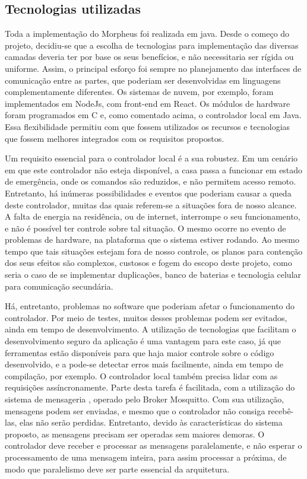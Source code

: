 \subsection{Tecnologias utilizadas}
Toda a implementação do Morpheus foi realizada em java. Desde o começo do projeto, decidiu-se que a escolha de tecnologias para implementação das diversas camadas deveria ter por base os seus benefícios, e não necessitaria ser rígida ou uniforme. Assim, o principal esforço foi sempre no planejamento das interfaces de comunicação entre as partes, que poderiam ser desenvolvidas em linguagens complementamente diferentes. Os sistemas de nuvem, por exemplo, foram implementados em NodeJs, com front-end em React. Os módulos de hardware foram programados em C e, como comentado acima, o controlador local em Java.
Essa flexibilidade permitiu com que fossem utilizados os recursos e tecnologias que fossem melhores integrados com os requisitos propostos. 

Um requisito essencial para o controlador local é a sua robustez. Em um cenário em que este controlador não esteja disponível, a casa passa a funcionar em estado de emergência, onde os comandos são reduzidos, e não permitem acesso remoto. Entretanto, há inúmeras possibilidades e eventos que poderiam causar a queda deste controlador, muitas das quais referem-se a situações fora de nosso alcance. A falta de energia na residência, ou de internet, interrompe o seu funcionamento, e não é possível ter controle sobre tal situação. O mesmo ocorre no evento de problemas de hardware, na plataforma que o sistema estiver rodando. Ao mesmo tempo que tais situações estejam fora de nosso controle, os planos para contenção dos seus efeitos são complexos, custosos e fogem do escopo deste projeto, como seria o caso de se implementar duplicações, banco de baterias e tecnologia celular para comunicação secundária.

Há, entretanto, problemas no software que poderiam afetar o funcionamento do controlador. Por meio de testes, muitos desses problemas podem ser evitados, ainda em tempo de desenvolvimento. A utilização de tecnologias que facilitam o desenvolvimento seguro da aplicação é uma vantagem para este caso, já que ferramentas estão disponíveis para que haja maior controle sobre o código desenvolvido, e a pode-se detectar erros mais facilmente, ainda em tempo de compilação, por exemplo.
O controlador local também precisa lidar com as requisições assíncronamente. Parte desta tarefa é facilitada, com a utilização do sistema de mensageria \wmqtt, operado pelo Broker Mosquitto. Com sua utilização, mensagens podem ser enviadas, e mesmo que o controlador não consiga recebê-las, elas não serão perdidas. Entretanto, devido às características do sistema proposto, as mensagens precisam ser operadas sem maiores demoras. O controlador deve receber e processar as mensagens paralelamente, e não esperar o processamento de uma mensagem inteira, para assim processar a próxima, de modo que paralelismo deve ser parte essencial da arquitetura.

